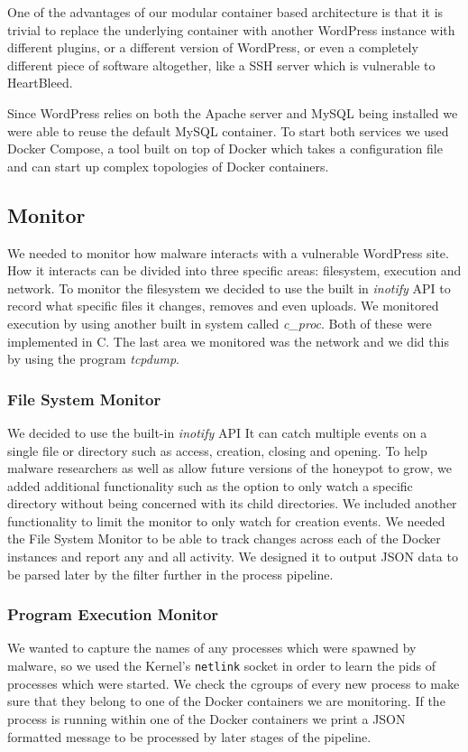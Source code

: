 \documentclass[10pt,conference,draftclsnofoot,onecolumn]{IEEEtran}
\begin{document}
One of the advantages of our modular container based architecture is that it is trivial to replace the underlying container with another WordPress instance with different plugins, or a different version of WordPress, or even a completely different piece of software altogether, like a SSH server which is vulnerable to HeartBleed.

Since WordPress relies on both the Apache server and MySQL being installed we were able to reuse the default MySQL container. To start both services we used Docker Compose, a tool built on top of Docker which takes a configuration file and can start up complex topologies of Docker containers.

\subsection{Monitor}
We needed to monitor how malware interacts with a vulnerable WordPress site. How it interacts can be divided into three specific areas: filesystem, execution and network.
To monitor the filesystem we decided to use the built in \textit{inotify} API to record what specific files it changes, removes and even uploads.
We monitored execution by using another built in system called \textit{c\_proc}.
Both of these were implemented in C. The last area we monitored was the network and we did this by using the program \textit{tcpdump}.
%
\subsubsection{File System Monitor}
We decided to use the built-in \textit{inotify} API It can catch multiple events on a single file or directory such as access, creation, closing and opening. To help malware researchers as well as allow future versions of the honeypot to grow, we added additional functionality such as the option to only watch a specific directory without being concerned with its child directories. We included another functionality to limit the monitor to only watch for creation events.  We needed the File System Monitor to be able to track changes across each of the Docker instances and report any and all activity. We designed it to output JSON data to be parsed later by the filter further in the process pipeline. 


\subsubsection{Program Execution Monitor}
    We wanted to capture the names of any processes which were spawned by malware, so we used the Kernel’s \texttt{netlink} socket in order to learn the pids of processes which were started. We check the cgroups of every new process to make sure that they belong to one of the Docker containers we are monitoring. If the process is running within one of the Docker containers we print a JSON formatted message to be processed by later stages of the pipeline.
\end{document}
